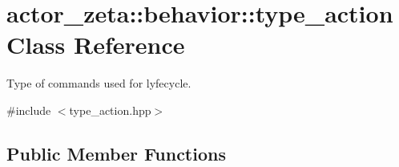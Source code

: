 \hypertarget{classactor__zeta_1_1behavior_1_1type__action}{}\section{actor\+\_\+zeta\+:\+:behavior\+:\+:type\+\_\+action Class Reference}
\label{classactor__zeta_1_1behavior_1_1type__action}


Type of commands used for lyfecycle.  




{\ttfamily \#include $<$type\+\_\+action.\+hpp$>$}

\subsection*{Public Member Functions}
